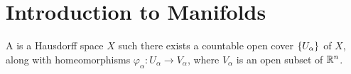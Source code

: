 \section{Introduction to Manifolds}
%
\begin{defn}
A  is a Hausdorff space $X$ such there exists a countable open cover $\left\lbrace U_\alpha \right\rbrace$ of $X$, along with homeomorphisms $\varphi_\alpha : U_\alpha \to V_\alpha$, where $V_\alpha$ is an open subset of $\mathbb{R}^n$.
\end{defn}